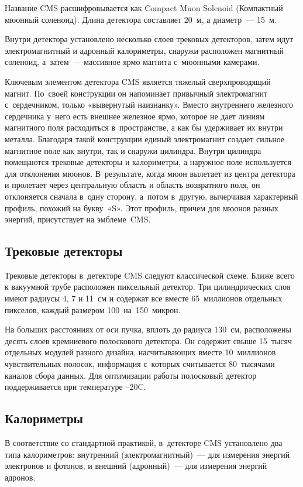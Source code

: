 \documentclass[12pt]{kiarticle}
\begin{document}
	Название CMS расшифровывается как Compact Muon Solenoid (Компактный мюонный соленоид). Длина детектора составляет 20 м, а диаметр — 15 м.
	
	Внутри детектора установлено несколько слоев трековых детекторов, затем идут электромагнитный и адронный калориметры, снаружи расположен магнитный соленоид, а затем — массивное ярмо магнита с мюонными камерами.
	
	Ключевым элементом детектора CMS является тяжелый сверхпроводящий магнит. По своей конструкции он напоминает привычный электромагнит с сердечником, только «вывернутый наизнанку». Вместо внутреннего железного сердечника у него есть внешнее железное ярмо, которое не дает линиям магнитного поля расходиться в пространстве, а как бы удерживает их внутри металла. Благодаря такой конструкции единый электромагнит создает сильное магнитное поле как внутри, так и снаружи цилиндра. Внутри цилиндра помещаются трековые детекторы и калориметры, а наружное поле используется для отклонения мюонов. В результате, когда мюон вылетает из центра детектора и пролетает через центральную область и область возвратного поля, он отклоняется сначала в одну сторону, а потом в другую, вычерчивая характерный профиль, похожий на букву «S». Этот профиль, причем для мюонов разных энергий, присутствует на эмблеме CMS.
	
	\subsection{Трековые детекторы}
	Трековые детекторы в детекторе CMS следуют классической схеме. Ближе всего к вакуумной трубе расположен пиксельный детектор. Три цилиндрических слоя имеют радиусы 4, 7 и 11 см и содержат все вместе 65 миллионов отдельных пикселов, каждый размером 100 на 150 микрон.
	
	На больших расстояниях от оси пучка, вплоть до радиуса 130 см, расположены десять слоев кремниевого полоскового детектора. Он содержит свыше 15 тысяч отдельных модулей разного дизайна, насчитывающих вместе 10 миллионов чувствительных полосок, информация с которых считывается 80 тысячами каналов сбора данных. Для оптимизации работы полосковый детектор поддерживается при температуре –20C.
	
	\subsection{Калориметры}
	
	В соответствие со стандартной практикой, в детекторе CMS установлено два типа калориметров: внутренний (электромагнитный) — для измерения энергий электронов и фотонов, и внешний (адронный) — для измерения энергий адронов.
	
\end{document}
